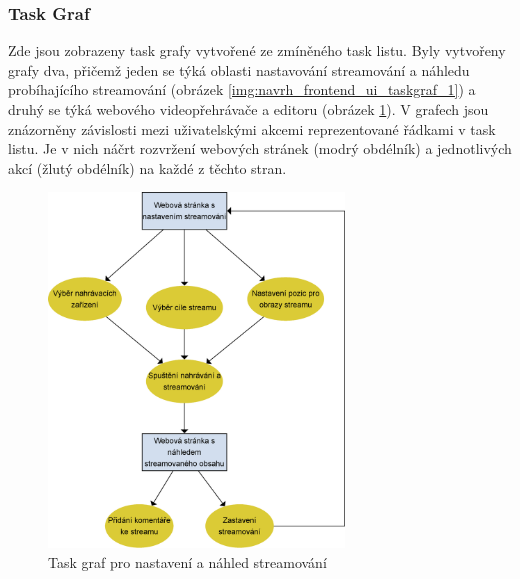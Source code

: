 \documentclass[thesis=M,czech]{FITthesis}[2012/06/26]
\begin{document}
\subsubsection{Task Graf} \label{subsubsec:navrh_frontend_ui_taskgraf}
Zde jsou zobrazeny task grafy vytvořené ze zmíněného task listu. Byly vytvořeny grafy dva, přičemž jeden se týká oblasti nastavování streamování a náhledu probíhajícího streamování (obrázek \ref{img:navrh_frontend_ui_taskgraf_1}) a druhý se týká webového videopřehrávače a editoru (obrázek \ref{img:navrh_frontend_ui_taskgraf_2}). V grafech jsou znázorněny závislosti mezi uživatelskými akcemi reprezentované řádkami v task listu. Je v nich náčrt rozvržení webových stránek (modrý obdélník) a jednotlivých akcí (žlutý obdélník) na každé z těchto stran.
\\
\begin{figure}[h]\centering
	\includegraphics[width=0.7\textwidth]{images/ui_task_flow_1.eps}
	\caption{Task graf pro nastavení a náhled streamování}\label{img:navrh_frontend_ui_taskgraf_2}
\end{figure}
\\
\end{document}
